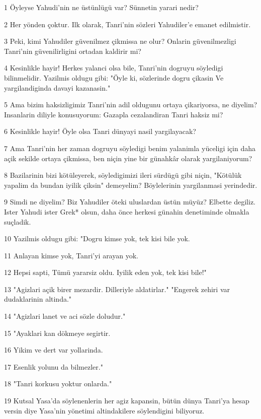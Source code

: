 \par 1 Öyleyse Yahudi'nin ne üstünlügü var? Sünnetin yarari nedir?
\par 2 Her yönden çoktur. Ilk olarak, Tanri'nin sözleri Yahudiler'e emanet edilmistir.
\par 3 Peki, kimi Yahudiler güvenilmez çikmissa ne olur? Onlarin güvenilmezligi Tanri'nin güvenilirligini ortadan kaldirir mi?
\par 4 Kesinlikle hayir! Herkes yalanci olsa bile, Tanri'nin dogruyu söyledigi bilinmelidir. Yazilmis oldugu gibi: "Öyle ki, sözlerinde dogru çikasin Ve yargilandiginda davayi kazanasin."
\par 5 Ama bizim haksizligimiz Tanri'nin adil oldugunu ortaya çikariyorsa, ne diyelim? Insanlarin diliyle konusuyorum: Gazapla cezalandiran Tanri haksiz mi?
\par 6 Kesinlikle hayir! Öyle olsa Tanri dünyayi nasil yargilayacak?
\par 7 Ama Tanri'nin her zaman dogruyu söyledigi benim yalanimla yüceligi için daha açik sekilde ortaya çikmissa, ben niçin yine bir günahkâr olarak yargilaniyorum?
\par 8 Bazilarinin bizi kötüleyerek, söyledigimizi ileri sürdügü gibi niçin, "Kötülük yapalim da bundan iyilik çiksin" demeyelim? Böylelerinin yargilanmasi yerindedir.
\par 9 Simdi ne diyelim? Biz Yahudiler öteki uluslardan üstün müyüz? Elbette degiliz. Ister Yahudi ister Grek* olsun, daha önce herkesi günahin denetiminde olmakla suçladik.
\par 10 Yazilmis oldugu gibi: "Dogru kimse yok, tek kisi bile yok.
\par 11 Anlayan kimse yok, Tanri'yi arayan yok.
\par 12 Hepsi sapti, Tümü yararsiz oldu. Iyilik eden yok, tek kisi bile!"
\par 13 "Agizlari açik birer mezardir. Dilleriyle aldatirlar." "Engerek zehiri var dudaklarinin altinda."
\par 14 "Agizlari lanet ve aci sözle doludur."
\par 15 "Ayaklari kan dökmeye segirtir.
\par 16 Yikim ve dert var yollarinda.
\par 17 Esenlik yolunu da bilmezler."
\par 18 "Tanri korkusu yoktur onlarda."
\par 19 Kutsal Yasa'da söylenenlerin her agiz kapansin, bütün dünya Tanri'ya hesap versin diye Yasa'nin yönetimi altindakilere söylendigini biliyoruz.
